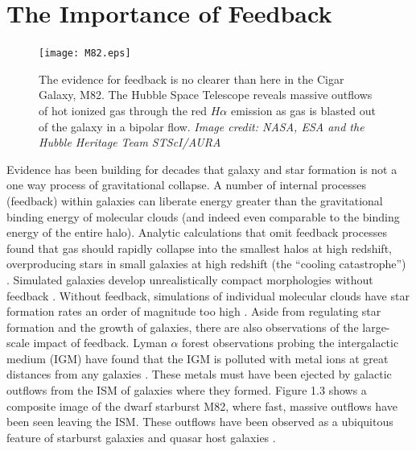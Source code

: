 \section{The Importance of Feedback}\label{intro:fb}
\begin{figure}
    \texttt{[image: M82.eps]}
	\caption[Massive outflows in M82]{The evidence for feedback is no clearer
	than here in the Cigar Galaxy, M82.  The Hubble Space Telescope reveals massive
	outflows of hot ionized gas through the red $H\alpha$ emission as gas is
	blasted out of the galaxy in a bipolar flow. \textit{Image credit: NASA, ESA
	and the Hubble Heritage Team STScI/AURA}}
\end{figure}
Evidence has been building for decades that galaxy and star formation is not a
one way process of gravitational collapse.  A number of internal processes
(feedback) within galaxies can liberate energy greater than the gravitational
binding energy of molecular clouds (and indeed even comparable to the binding
energy of the entire halo).  Analytic calculations that omit feedback processes
found that gas should rapidly collapse into the smallest halos at high redshift,
overproducing stars in small galaxies at high redshift (the ``cooling
catastrophe'') \citep{Cole2001,Benson2003}.  
Simulated galaxies develop unrealistically compact morphologies without feedback
\citep{Stinson2006}.  Without feedback, simulations of individual molecular
clouds have star formation rates an order of magnitude too high
\citep{Agertz2013}.  Aside from regulating star formation and the growth of
galaxies, there are also observations of the large-scale impact of feedback.
Lyman $\alpha$ forest observations probing the intergalactic medium (IGM) have
found that the IGM is polluted with metal ions at great distances from any
galaxies \citep{Sargent1988,Songaila1996,Dave1998}.  These metals must have been
ejected by galactic outflows from the ISM of galaxies where they formed. Figure
1.3 shows a composite image of the dwarf starburst M82, where fast, massive
outflows have been seen leaving the ISM.  These outflows have been observed as a
ubiquitous feature of starburst galaxies and quasar host galaxies
\citep{Veilleux2005,Werk2014}.

